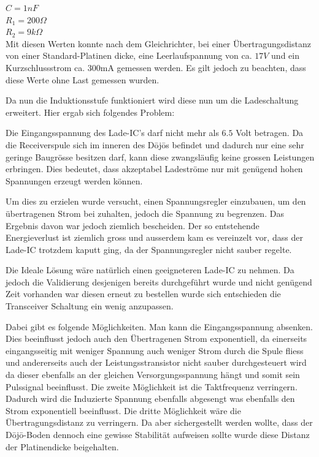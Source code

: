 $C = 1nF$\\
$R_{1} = 200\Omega$\\
$R_{2} = 9 k\Omega$\\

Mit diesen Werten konnte nach dem Gleichrichter, bei einer Übertragungsdistanz von einer Standard-Platinen dicke, eine Leerlaufspannung von ca. $17V$ und ein Kurzschlussstrom ca. 300mA gemessen werden. Es gilt jedoch zu beachten, dass diese Werte ohne Last gemessen wurden. 

Da nun die Induktionsstufe funktioniert wird diese nun um die Ladeschaltung erweitert. Hier ergab sich folgendes Problem:

Die Eingangsspannung des Lade-IC’s darf nicht mehr als $6.5$ Volt betragen. Da die Receiverspule sich im inneren des Dōjōs befindet und dadurch nur eine sehr geringe Baugrösse besitzen darf, kann diese zwangsläufig keine grossen Leistungen erbringen. Dies bedeutet, dass akzeptabel Ladeströme nur mit genügend hohen Spannungen erzeugt werden können.

Um dies zu erzielen wurde versucht, einen Spannungsregler einzubauen, um den übertragenen Strom bei zuhalten, jedoch die Spannung zu begrenzen. Das Ergebnis davon war jedoch ziemlich bescheiden. Der so entstehende Energieverlust ist ziemlich gross und ausserdem kam es vereinzelt vor, dass der Lade-IC trotzdem kaputt ging, da der Spannungsregler nicht sauber regelte. 

Die Ideale Lösung wäre natürlich einen geeigneteren Lade-IC zu nehmen. Da jedoch die Validierung desjenigen bereits durchgeführt wurde und nicht genügend Zeit vorhanden war diesen erneut zu bestellen wurde sich entschieden die Transceiver Schaltung ein wenig anzupassen.

Dabei gibt es folgende Möglichkeiten. Man kann die Eingangsspannung absenken. Dies beeinflusst jedoch auch den Übertragenen Strom exponentiell, da einerseits eingangsseitig mit weniger Spannung auch weniger Strom durch die Spule fliess und andererseits auch der Leistungsstransistor nicht sauber durchgesteuert wird da dieser ebenfalls an der gleichen Versorgungsspannung hängt und somit sein Pulssignal beeinflusst. Die zweite Möglichkeit ist die Taktfrequenz verringern. Dadurch wird die Induzierte Spannung ebenfalls abgesengt was ebenfalls den Strom exponentiell beeinflusst. Die dritte Möglichkeit wäre die Übertragungsdistanz zu verringern. Da aber sichergestellt werden wollte, dass der Dōjō-Boden dennoch eine gewisse Stabilität aufweisen sollte wurde diese Distanz der Platinendicke beigehalten.

